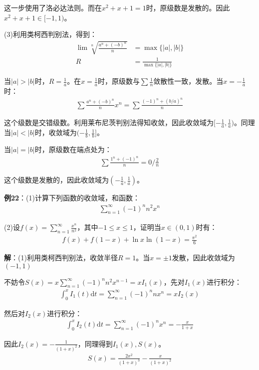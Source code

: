 \documentclass{ctexart}
\let\oldtextbf\textbf
\renewcommand{\textbf}[1]{\textcolor{brown!50!red}{\oldtextbf{#1}}}
\begin{document}
这一步使用了洛必达法则。而在$x^2+x+1=1$时，原级数是发散的。因此$x^2+x+1\in[-1,1)$。

(3)利用类柯西判别法，得到：
\begin{align*}
    \lim\sqrt[n]{\frac{a^n+(-b)^n}{n}}&=\max\{|a|,|b|\}\\
    R&=\frac{1}{\max\{|a|,|b|\}}
\end{align*}

当$|a|>|b|$时，$R=\frac{1}{a}$。在$x=\frac{1}{a}$时，原级数与$\sum \frac{1}{n}$敛散性一致，发散。当$x=-\frac{1}{a}$时：
\begin{align*}
    \sum \frac{a^n+(-b)^n}{n}x^n=\sum\frac{(-1)^n+(b/a)^n}{n}
\end{align*}

这个级数是交错级数。利用莱布尼茨判别法得知收敛，因此收敛域为$[-\frac{1}{a},\frac{1}{a})$。同理当$|a|<|b|$时，收敛域为$(-\frac{1}{b},\frac{1}{b}]$。

当$|a|=|b|$时，原级数在端点处为：
\begin{align*}
    \sum\frac{1^n+(-1)^n}{n}=0/\frac{2}{n}
\end{align*}

这个级数是发散的，因此收敛域为$(-\frac{1}{a},\frac{1}{a})$。

\textbf{\color{brown!50!red}例22}：(1)计算下列函数的收敛域，和函数：
\begin{align*}
    \sum_{n=1}^\infty(-1)^nn^2x^n
\end{align*}

(2)设$f(x)=\sum_{n=1}^\infty \frac{x^n}{n^2}$，其中$-1\leq x\leq 1$，证明当$x\in(0,1)$时有：
\begin{align*}
    f(x)+f(1-x)+\ln x\ln (1-x)=\frac{\pi^2}{6}
\end{align*}

\textbf{\color{brown!50!red}解}：(1)利用类柯西判别法，收敛半径$R=1$。当$x=\pm 1$发散，因此收敛域为$(-1,1)$

不妨令$S(x)=x\sum_{n=1}^\infty (-1)^nn^2x^{n-1}=xI_1(x)$，先对$I_1(x)$进行积分：
\begin{align*}
  \int_0^x I_1(t)\mathrm{d}t=\sum_{n=1}^\infty (-1)^nnx^n=xI_2(x)
\end{align*}

然后对$I_2(x)$进行积分：
\begin{align*}
  \int_0^x I_2(t)\mathrm{d}t=\sum_{n=1}^\infty (-1)^nx^n=-\frac{x}{1+x} 
\end{align*}

因此$I_2(x)=-\frac{1}{(1+x)^2}$，同理得到$I_1(x),S(x)$。
\begin{align*}
    S(x)=\frac{2x^2}{(1+x)^3}-\frac{x}{(1+x)^2}
\end{align*}
\end{document}
